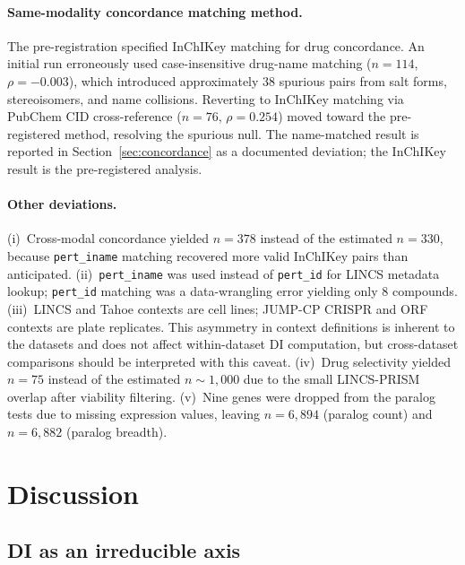 \documentclass[11pt]{article}
\begin{document}
\paragraph{Same-modality concordance matching method.}
The pre-registration specified InChIKey matching for drug concordance.
An initial run erroneously used case-insensitive drug-name matching
($n = 114$, $\rho = -0.003$), which introduced approximately 38
spurious pairs from salt forms, stereoisomers, and name collisions.
Reverting to InChIKey matching via PubChem CID cross-reference
($n = 76$, $\rho = 0.254$) moved toward the pre-registered method,
resolving the spurious null.  The name-matched result is reported in
Section~\ref{sec:concordance} as a documented deviation; the InChIKey
result is the pre-registered analysis.

\paragraph{Other deviations.}
(i)~Cross-modal concordance yielded $n = 378$ instead of the estimated $n = 330$, because
\texttt{pert\_iname} matching recovered more valid InChIKey pairs than
anticipated.
(ii)~\texttt{pert\_iname} was used instead of \texttt{pert\_id} for
LINCS metadata lookup; \texttt{pert\_id} matching was a data-wrangling
error yielding only 8 compounds.
(iii)~LINCS and Tahoe contexts are cell lines; JUMP-CP CRISPR and ORF
contexts are plate replicates.  This asymmetry in context definitions is
inherent to the datasets and does not affect within-dataset DI
computation, but cross-dataset comparisons should be interpreted with
this caveat.
(iv)~Drug selectivity yielded $n = 75$ instead of the estimated $n \sim 1{,}000$ due
to the small LINCS-PRISM overlap after viability filtering.
(v)~Nine genes were dropped from the paralog tests due to missing
expression values, leaving $n = 6{,}894$ (paralog count) and
$n = 6{,}882$ (paralog breadth).


\section{Discussion}
\label{sec:discussion}

\subsection{DI as an irreducible axis}
\end{document}
